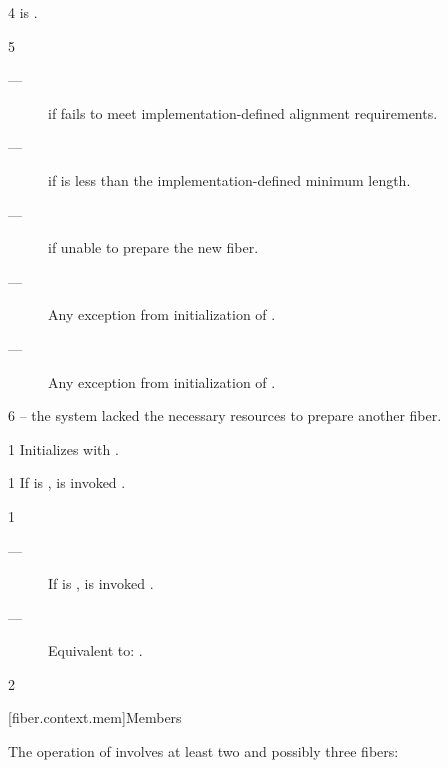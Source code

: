 4 \postcond
\emptyfn is \false.

5 \except
\begin{description}
    \item[---]  if  fails to meet
               implementation-defined alignment requirements.
    \item[---]  if  is less than the
               implementation-defined minimum length.
    \item[---]  if unable to prepare the new fiber.
    \item[---] Any exception from initialization of .
    \item[---] Any exception from initialization of .
\end{description}

6 \errors
{} -- the system lacked the necessary resources to prepare another fiber.


1 \effects
Initializes  with .


1 \effects
If \emptyfn is \false,  is invoked .


1 \effects
\begin{description}
    \item[---] If \emptyfn is \false,  is invoked .
    \item[---] Equivalent to: .
\end{description}

2 \returns
\this

[fiber.context.mem]{Members}

The operation of \resumewith involves at least two and possibly three fibers:

